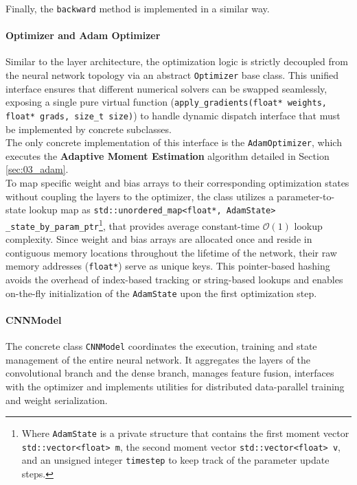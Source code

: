 Finally, the \texttt{backward} method is implemented in a similar way.

\paragraph{Optimizer and Adam Optimizer}

Similar to the layer architecture, the optimization logic is strictly decoupled from the neural network topology via an abstract \texttt{Optimizer} base class. This unified interface ensures that different numerical solvers can be swapped seamlessly, exposing a single pure virtual function (\texttt{apply\_gradients(float* weights, float* grads, size\_t size)}) to handle dynamic dispatch interface that must be implemented by concrete subclasses.\\

The only concrete implementation of this interface is the \texttt{AdamOptimizer}, which executes the \textbf{Adaptive Moment Estimation} algorithm detailed in Section \ref{sec:03_adam}.\\

To map specific weight and bias arrays to their corresponding optimization states without coupling the layers to the optimizer, the class utilizes a parameter-to-state lookup map as \texttt{std::unordered\_map<float*, AdamState> \_state\_by\_param\_ptr}\footnote{Where \texttt{AdamState} is a private structure that contains the first moment vector \texttt{std::vector<float> m}, the second moment vector \texttt{std::vector<float> v}, and an unsigned integer \texttt{timestep} to keep track of the parameter update steps.}, that provides average constant-time $\mathcal{O}(1)$ lookup complexity. Since weight and bias arrays are allocated once and reside in contiguous memory locations throughout the lifetime of the network, their raw memory addresses (\texttt{float*}) serve as unique keys. This pointer-based hashing avoids the overhead of index-based tracking or string-based lookups and enables on-the-fly initialization of the \texttt{AdamState} upon the first optimization step.

\paragraph{CNNModel}
\label{sec:03_CI_CNN}

The concrete class \texttt{CNNModel} coordinates the execution, training and state management of the entire neural network. It aggregates the layers of the convolutional branch and the dense branch, manages feature fusion, interfaces with the optimizer and implements utilities for distributed data-parallel training and weight serialization.\\

